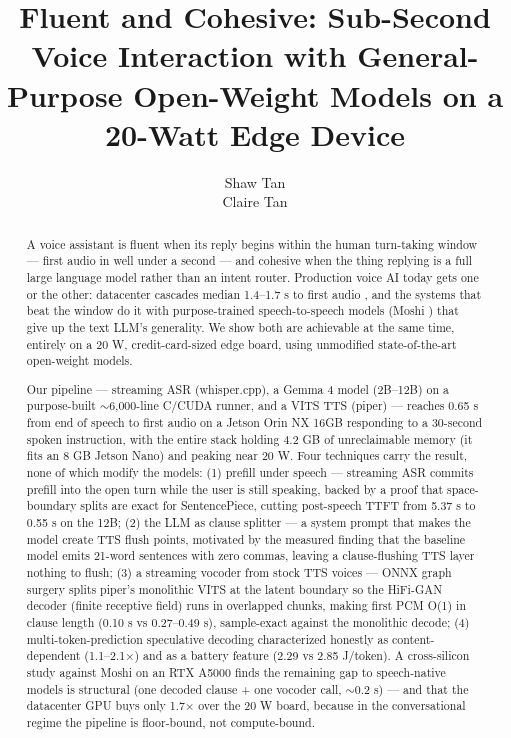 \documentclass{article}
\title{Fluent and Cohesive: Sub-Second Voice Interaction with General-Purpose Open-Weight Models on a 20-Watt Edge Device}
\author{ Shaw Tan \\
	\And
	Claire Tan \\
}
\begin{document}
\maketitle

\begin{abstract}
A voice assistant is fluent when its reply begins within the human turn-taking window — first audio in well under a second — and cohesive when the thing replying is a full large language model rather than an intent router. Production voice AI today gets one or the other: datacenter cascades median 1.4–1.7 s to first audio \citep{sharma2026latency,hamming2026metrics}, and the systems that beat the window do it with purpose-trained speech-to-speech models (Moshi \citep{defossez2024moshi}) that give up the text LLM's generality. We show both are achievable at the same time, entirely on a 20 W, credit-card-sized edge board, using unmodified state-of-the-art open-weight models.

Our pipeline — streaming ASR (whisper.cpp), a Gemma 4 model (2B–12B) on a purpose-built $\sim$6,000-line C/CUDA runner, and a VITS TTS (piper) — reaches 0.65 s from end of speech to first audio on a Jetson Orin NX 16GB responding to a 30-second spoken instruction, with the entire stack holding 4.2 GB of unreclaimable memory (it fits an 8 GB Jetson Nano) and peaking near 20 W. Four techniques carry the result, none of which modify the models: (1) prefill under speech — streaming ASR commits prefill into the open turn while the user is still speaking, backed by a proof that space-boundary splits are exact for SentencePiece, cutting post-speech TTFT from 5.37 s to 0.55 s on the 12B; (2) the LLM as clause splitter — a system prompt that makes the model create TTS flush points, motivated by the measured finding that the baseline model emits 21-word sentences with zero commas, leaving a clause-flushing TTS layer nothing to flush; (3) a streaming vocoder from stock TTS voices — ONNX graph surgery splits piper's monolithic VITS at the latent boundary so the HiFi-GAN decoder (finite receptive field) runs in overlapped chunks, making first PCM O(1) in clause length (0.10 s vs 0.27–0.49 s), sample-exact against the monolithic decode; (4) multi-token-prediction speculative decoding characterized honestly as content-dependent (1.1–2.1×) and as a battery feature (2.29 vs 2.85 J/token). A cross-silicon study against Moshi on an RTX A5000 finds the remaining gap to speech-native models is structural (one decoded clause + one vocoder call, $\sim$0.2 s) — and that the datacenter GPU buys only 1.7× over the 20 W board, because in the conversational regime the pipeline is floor-bound, not compute-bound.
\end{abstract}
\end{document}
